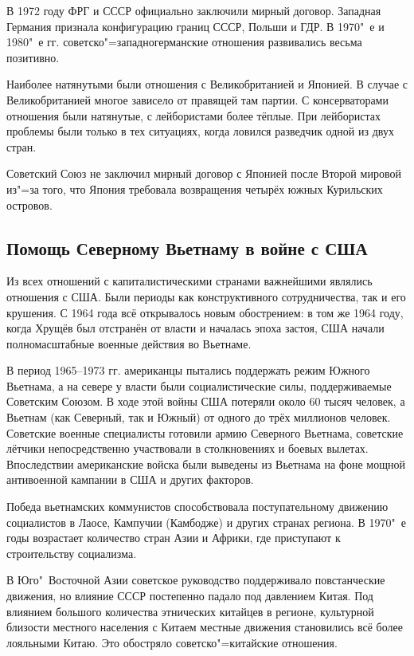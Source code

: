     В 1972 году ФРГ и СССР официально заключили мирный договор. Западная Германия признала конфигурацию границ СССР, Польши и ГДР. В 1970"~е и 1980"~е гг. советско"=западногерманские отношения развивались весьма позитивно.
    
    Наиболее натянутыми были отношения с Великобританией и Японией. В случае с Великобританией многое зависело от правящей там партии. С консерваторами отношения были натянутые, с лейбористами более тёплые. При лейбористах проблемы были только в тех ситуациях, когда ловился разведчик одной из двух стран.
    
    Советский Союз не заключил мирный договор с Японией после Второй мировой из"=за того, что Япония требовала возвращения четырёх южных Курильских островов.
    
    \subsection{Помощь Северному Вьетнаму в войне с США}

    Из всех отношений с капиталистическими странами важнейшими являлись отношения с США. Были периоды как конструктивного сотрудничества, так и его крушения. С 1964 года всё открывалось новым обострением: в том же 1964 году, когда Хрущёв был отстранён от власти и началась эпоха застоя, США начали полномасштабные военные действия во Вьетнаме.
  
    В период 1965--1973 гг. американцы пытались поддержать режим Южного Вьетнама, а на севере у власти были социалистические силы, поддерживаемые Советским Союзом. В ходе этой войны США потеряли около 60 тысяч человек, а Вьетнам (как Северный, так и Южный) от одного до трёх миллионов человек. Советские военные специалисты готовили армию Северного Вьетнама, советские лётчики непосредственно участвовали в столкновениях и боевых вылетах. Впоследствии американские войска были выведены из Вьетнама на фоне мощной антивоенной кампании в США и других факторов.
    
    Победа вьетнамских коммунистов способствовала поступательному движению социалистов в Лаосе, Кампучии (Камбодже) и других странах региона. В 1970"~е годы возрастает количество стран Азии и Африки, где приступают к строительству социализма.
    
    В Юго"~Восточной Азии советское руководство поддерживало повстанческие движения, но влияние СССР постепенно падало под давлением Китая. Под влиянием большого количества этнических китайцев в регионе, культурной близости местного населения с Китаем местные движения становились всё более лояльными Китаю. Это обостряло советско"=китайские отношения.

